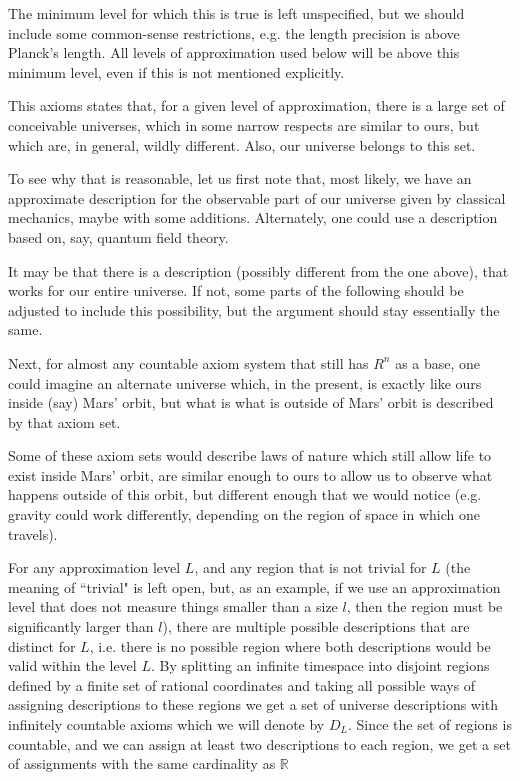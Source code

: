\documentclass[a4paper
,draft
]{article}
\def\reale{\mathbb{R}}
\def\descriptions{D_L}
\newcommand{\ghilimele}[1]{``#1"}
\begin{document}
The minimum level for which this is true is left unspecified, but we should
include some common-sense restrictions, e.g. the length precision is above
Planck's length. All levels of approximation used below will be above this
minimum level, even if this is not mentioned explicitly.

This axioms states that, for a given level of approximation,
there is a large set of conceivable universes, which in some narrow respects
are similar to ours, but which are, in general, wildly different.
Also, our universe belongs to this set.

To see why that is reasonable, let us first note that,
most likely, we have an approximate description for the observable part
of our universe
given by classical mechanics, maybe with some additions.
Alternately, one could use a description based on, say, quantum field theory.

It may be that there is a description (possibly different from the one above),
that works for our entire universe.
If not, some parts of the following should
be adjusted to include this possibility, but the argument should stay
essentially the same.

Next, for almost any countable axiom system that still
has $R^n$ as a base, one could imagine an alternate universe
which, in the present, is exactly like ours inside (say) Mars' orbit,
but what is what is outside of Mars' orbit is described by that axiom set.

Some of these axiom sets would describe laws of nature which still allow life
to exist inside Mars' orbit, are similar enough
to ours to allow us to observe what happens outside of this orbit,
but different enough that
we would notice (e.g. gravity could work differently, depending on the region
of space in which one travels).

For any approximation level $L$, and any region that is not trivial
for $L$
(the meaning of \ghilimele{trivial} is left open, but, as an example,
if we use an approximation level that does not measure things smaller
than a size $l$, then the region must be significantly larger than $l$),
there are multiple possible descriptions that
are distinct for $L$, i.e. there is no possible region where both descriptions
would be valid within the level $L$.
By splitting an infinite timespace
into disjoint regions defined by a finite set of rational coordinates
and taking all possible ways of assigning descriptions to these regions
we get a set of universe descriptions with infinitely countable axioms
which we will denote by $\descriptions$.
Since the set of regions is countable, and we can assign at least two
descriptions to each region, we get a set of assignments with the same
cardinality as $\reale$
\end{document}
